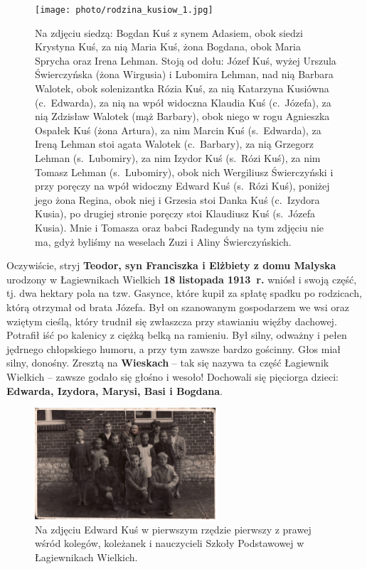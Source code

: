 \begin{figure}[!hp]
\begin{center}
\texttt{[image: photo/rodzina\_kusiow\_1.jpg]}
\caption[Rodzina Kusiów]{Na zdjęciu siedzą: Bogdan Kuś z synem Adasiem, obok siedzi Krystyna Kuś, za nią Maria Kuś, żona Bogdana, obok Maria Sprycha oraz Irena Lehman. Stoją od dołu: Józef Kuś, wyżej Urszula Świerczyńska (żona Wirgusia) i Lubomira Lehman, nad nią Barbara Walotek, obok solenizantka Rózia Kuś, za nią Katarzyna Kusiówna (c.~Edwarda), za nią na wpół widoczna Klaudia Kuś (c.~Józefa), za nią Zdzisław Walotek (mąż Barbary), obok niego w rogu Agnieszka Ospałek Kuś (żona Artura), za nim Marcin Kuś (s.~Edwarda), za Ireną Lehman stoi agata Walotek (c.~Barbary), za nią Grzegorz Lehman (s.~Lubomiry), za nim Izydor Kuś (s.~Rózi Kuś), za nim Tomasz Lehman (s.~Lubomiry), obok nich Wergiliusz Świerczyński i przy poręczy na wpół widoczny Edward Kuś (s.~Rózi Kuś), poniżej jego żona Regina, obok niej i Grzesia stoi Danka Kuś (c.~Izydora Kusia), po drugiej stronie poręczy stoi Klaudiusz Kuś (s.~Józefa Kusia). Mnie i Tomasza oraz babci Radegundy na tym zdjęciu nie ma, gdyż byliśmy na weselach Zuzi i Aliny Świerczyńskich.}
\label{rys:rodzina_kusiow_1}
\end{center}
\end{figure}



Oczywiście, stryj \textbf{Teodor, syn Franciszka i Elżbiety z domu Malyska} urodzony w Łagiewnikach Wielkich \textbf{18 listopada 1913~r.} wniósł i swoją część, tj. dwa hektary pola na tzw. Gasynce, które kupił za spłatę spadku po rodzicach, którą otrzymał od brata Józefa. Był on szanowanym gospodarzem we wsi oraz wziętym cieślą, który trudnił się zwłaszcza przy stawianiu więźby dachowej. Potrafił iść po kalenicy z ciężką belką na ramieniu. Był silny, odważny i pełen jędrnego chłopskiego humoru, a przy tym zawsze bardzo gościnny. Głos miał silny, donośny. Zresztą na \textbf{Wieskach} -- tak się nazywa ta część Łagiewnik Wielkich -- zawsze godało się głośno i wesoło! Dochowali się pięciorga dzieci: \textbf{Edwarda, Izydora, Marysi, Basi i Bogdana}.
\begin{figure}[!h]
\begin{center}
\includegraphics[width=0.6\textwidth]{photo/edward_kus_1.jpg}
\caption[Edward Kuś wśród kolegów, koleżanek i nauczycieli Szkoły Podstawowej w Łagiewnikach Wielkich]{Na zdjęciu Edward Kuś w pierwszym rzędzie pierwszy z prawej wśród kolegów, koleżanek i nauczycieli Szkoły Podstawowej w Łagiewnikach Wielkich.}
\label{rys:edward_kus_1}
\end{center}
\end{figure}

